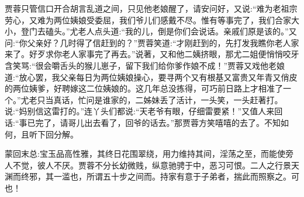 \begin{parag}
    贾蓉只管信口开合胡言乱道之间，只见他老娘醒了，请安问好，又说:“难为老祖宗劳心，又难为两位姨娘受委屈，我们爷儿们感戴不尽。惟有等事完了，我们合家大小，登门去磕头。”尤老人点头道:“我的儿，倒是你们会说话。亲戚们原是该的。”又问:“你父亲好？几时得了信赶到的？”贾蓉笑道:“才刚赶到的，先打发我瞧你老人家来了。好歹求你老人家事完了再去。”说著，又和他二姨挤眼，那尤二姐便悄悄咬牙含笑骂:“很会嚼舌头的猴儿崽子，留下我们给你爹作娘不成！”贾蓉又戏他老娘道:“放心罢，我父亲每日为两位姨娘操心，要寻两个又有根基又富贵又年青又俏皮的两位姨爹，好聘嫁这二位姨娘的。这几年总没拣得，可巧前日路上才相准了一个。”尤老只当真话，忙问是谁家的，二姊妹丢了活计，一头笑，一头赶著打。说:“妈别信这雷打的。”连丫头们都说:“天老爷有眼，仔细雷要紧！”又值人来回话:“事已完了，请哥儿出去看了，回爷的话去。”那贾蓉方笑嘻嘻的去了。不知如何，且听下回分解。
\end{parag}


\begin{parag}
    \begin{note}蒙回末总:宝玉品高性雅，其终日花围翠绕，用力维持其间，淫荡之至，而能使旁人不觉，彼人不厌。贾蓉不分长幼微贱，纵意驰骋于中，恶习可恨。二人之行景天渊而终邪，其一滥也，所谓五十步之间而。持家有意于子弟者，揣此而照察之。可也！\end{note}
\end{parag}

